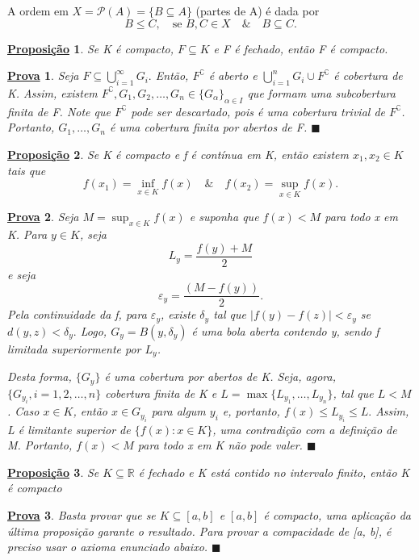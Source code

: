 \documentclass{article}
\newtheorem*{prop*}{\underline{Proposi\c c\~ao}}
\newtheorem*{proof*}{\underline{Prova}}
\renewcommand\qedsymbol{$\blacksquare$}
\begin{document}
A ordem em \(X = \mathcal{P}(A) = \{B\subseteq A\}\) (partes de A) é dada por
\[
	B\leq C,\quad \text{se } B, C\in X \quad\&\quad B\subseteq C.
\]
\begin{prop*}
	Se K é compacto, \(F\subseteq K\) e F é fechado, então F é compacto.
\end{prop*}
\begin{proof*}
	Seja \(F\subseteq \bigcup_{i=1}^{\infty}G_{i}.\) Então, \(F ^{\complement}\) é aberto e \(\bigcup_{i=1}^{n}G_{i}\cup F ^{\complement}\) é cobertura de K.
	Assim, existem \(F ^{\complement}, G_{1}, G_{2}, \dotsc , G_{n}\in \{G_{\alpha }\}_{\alpha \in I}\) que formam uma subcobertura finita de F. Note que \(F ^{\complement}\) pode ser
	descartado, pois é uma cobertura trivial de \(F ^{\complement}\). Portanto, \(G_{1}, \dotsc , G_{n}\) é uma cobertura finita por abertos de F. \qedsymbol
\end{proof*}
\begin{prop*}
	Se K é compacto e f é contínua em K, então existem \(x_{1}, x_{2}\in K\) tais que
	\[
		f(x_{1}) = \inf_{x\in K}f(x)\quad\&\quad f(x_{2}) = \sup_{x\in K}f(x).
	\]
\end{prop*}
\begin{proof*}
	Seja \(M = \sup_{x\in K}f(x)\) e suponha que \(f(x) < M\) para todo x em K. Para \(y\in K\), seja
	\[
		L_{y} = \frac{f(y) + M}{2}
	\]
	e seja
	\[
		\varepsilon_y = \frac{(M-f(y))}{2}.
	\]
	Pela continuidade da f, para \(\varepsilon_y\), existe \(\delta _y\) tal que \(|f(y) - f(z)| < \varepsilon_{y}\) se \(d(y, z)< \delta_y.\)
	Logo, \(G_{y} = B(y, \delta_y)\) é uma bola aberta contendo y, sendo f limitada superiormente por \(L_y\).

	Desta forma, \(\{G_y\}\) é uma cobertura por abertos de K. Seja, agora, \(\{G_{y_{i}}, i = 1, 2, \dotsc , n\}\) cobertura finita de K e \(L = \max\{L_{y_1}, \dotsc , L_{y_{n}}\}\),
	tal que \(L < M\). Caso \(x\in K\), então \(x\in G_{y_{i}}\) para algum \(y_{i}\) e, portanto, \(f(x) \leq L_{y_{i}} \leq L.\) Assim, L é limitante superior de \(\{f(x):x \in K\}\), uma
	contradição com a definição de M. Portanto, \(f(x) < M\) para todo x em K não pode valer. \qedsymbol
\end{proof*}
\begin{prop*}
	Se \(K\subseteq \mathbb{R}\) é fechado e K está contido no intervalo finito, então K é compacto
\end{prop*}
\begin{proof*}
	Basta provar que se \(K\subseteq [a, b]\) e \([a, b]\) é compacto, uma aplicação da última proposição garante o resultado.
	Para provar a compacidade de [a, b], é preciso usar o axioma enunciado abaixo. \qedsymbol
\end{proof*}
\end{document}
